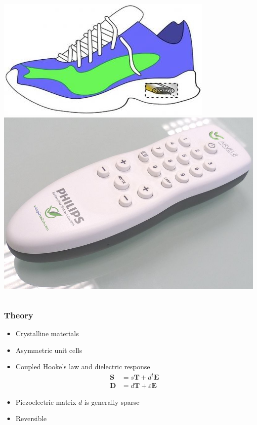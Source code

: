 \documentclass{beamer}
\renewcommand{\vec}{\mathbf}
\begin{document}
\begin{frame}
\begin{columns}
\begin{column}{.4\textwidth}
\includegraphics[width=\textwidth]{./Slike/Piezo-shoe} \\
\includegraphics[width=\textwidth]{./Slike/Piezo-remote}

 \end{column}


\end{columns}


\end{frame}

\begin{frame}
  \frametitle{Theory}

\begin{itemize}
  \item Crystalline materials
  \item Asymmetric unit cells
  \item Coupled Hooke's law and dielectric response
  \begin{align*}
 \vec S &= s \vec T + d^t \vec E \\
 \vec D &= d \vec T + \varepsilon \vec E
  \end{align*}
  \item Piezoelectric matrix $d$ is generally sparse
  \item Reversible
\end{itemize}


\end{frame}
\end{document}
